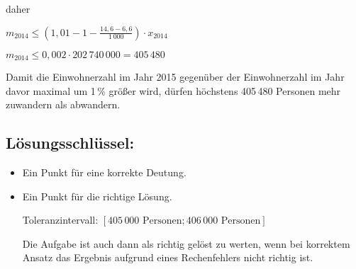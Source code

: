 \begin{langesbeispiel}
{\begin{enumerate}
daher

$m_{2014}\leq \left(1,01-1-\frac{14,6-6,6}{1\,000}\right)\cdot x_{2014}$

$m_{2014}\leq 0,002\cdot 202\,740\,000=405\,480$\leer

Damit die Einwohnerzahl im Jahr 2015 gegenüber der Einwohnerzahl im Jahr davor maximal um 1\,\% größer wird, dürfen höchstens 405\,480 Personen mehr zuwandern als abwandern.

\subsection{Lösungsschlüssel:}
\begin{itemize}
	\item Ein Punkt für eine korrekte Deutung.
	\item Ein Punkt für die richtige Lösung.
	
	Toleranzintervall: $[405\,000\text{ Personen};406\,000\text{ Personen}]$
	
	Die Aufgabe ist auch dann als richtig gelöst zu werten, wenn bei korrektem Ansatz das Ergebnis aufgrund eines Rechenfehlers nicht richtig ist.
\end{itemize}
\end{enumerate}}
		\end{langesbeispiel}